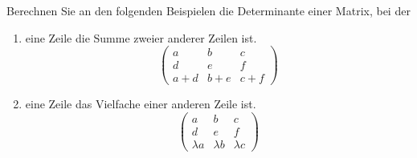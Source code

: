 \begin{ExerciseBlock}
Berechnen Sie an den folgenden Beispielen die Determinante einer Matrix, bei der

\begin{enumerate}[label=\alph*)]
\item eine Zeile die Summe zweier anderer Zeilen ist.
	\begin{equation*}
	 \begin{pmatrix}
	   a & b & c  \\
	   d & e & f  \\
	   a+d & b+e & c+f 
	 \end{pmatrix}
	\end{equation*}
\item eine Zeile das Vielfache einer anderen Zeile ist.
	\begin{equation*}
	 \begin{pmatrix}
	   a & b & c  \\
	   d & e & f  \\
	   \lambda a & \lambda b & \lambda c 
	 \end{pmatrix}
	\end{equation*}
\end{enumerate}

\end{ExerciseBlock}
